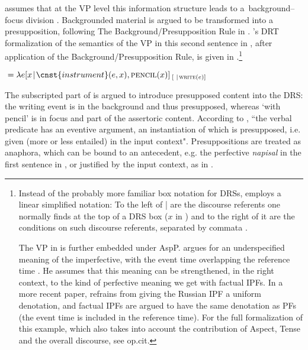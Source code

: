 \documentclass[output=paper,
modfonts,
newtxmath,
hidelinks
]{langscibook}
\begin{document}
\sloppy \noindent \citeauthor{gronndiss} assumes that at the VP level this information structure leads to a~background--focus division \citep[in the sense of][]{krifka01}. Backgrounded material is argued to be transformed into a presupposition, following The Background/Presupposition Rule in \citet{geurtssandt97}. \citeauthor{gronndiss}'s DRT formalization of the semantics of the VP in this second sentence in , after application of the Background/Presupposition Rule, is given in  \citep[][193]{gronndiss}.\footnote{Instead of the probably more familiar box notation for DRSs, \citeauthor{gronndiss} employs a linear simplified notation: To the left of | are the discourse referents one normally finds at the top of a DRS box ($x$ in ) and to the right of it are the conditions on such discourse referents, separated by commata \citep[for further discussion see][43]{gronndiss}. 

The VP in  is further embedded under AspP. \citet{gronndiss} argues for an underspecified meaning of the imperfective, with the event time overlapping the reference time  \citep[building on][]{klein95}. He assumes that this meaning can be strengthened, in the right context, to the kind of perfective meaning we get with factual IPFs. In a more recent paper, \citet{gronn15} refrains from giving the Russian IPF a uniform denotation, and factual IPFs are argued to have the same denotation as PFs (the event time is included in the reference time). For the full formalization of this example, which also takes into account the contribution of Aspect, Tense and the overall discourse, see op.cit.} 

\ea\label{gronnanalysis}
${}=\lambda e[x\hspace{0.1em} |\hspace{0.1em} \cnst{instrument}(e, x), \textsc{pencil}(x)]_{\hspace{2pt}[ \hspace{0.3em} |\hspace{0.1em}\textsc{write}(e)]}$
\z
	
\noindent The subscripted part of  is argued to introduce presupposed content into the DRS: the writing event is in the background and thus presupposed, whereas `with pencil' is in focus and part of the assertoric content. According to \citet[][192]{gronndiss}, ``the verbal predicate has an eventive argument, an instantiation of which is presupposed, i.e. given (more or less entailed) in the input context". Presuppositions are treated as anaphora, which can be bound to an antecedent, e.g. the perfective \textit{napisal} in the first sentence in , or justified by the input context, as in .
\end{document}
